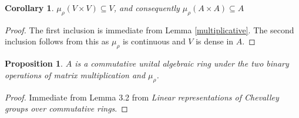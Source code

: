 \documentclass[12pt]{article}
\newtheorem{proposition}{Proposition}
\newtheorem{corollary}{Corollary}
\theoremstyle{definition}
\begin{document}
\begin{corollary}
$\mu_\rho(V \times V) \subseteq V$, and consequently $\mu_\rho(A \times A) \subseteq A$
\end{corollary}
\begin{proof}
The first inclusion is immediate from Lemma \ref{multiplicative}. The second inclusion follows from this as $\mu_\rho$ is continuous and $V$ is dense in $A$.
\end{proof}

\begin{proposition}
$A$ is a commutative unital algebraic ring under the two binary operations of matrix multiplication and $\mu_\rho$.
\end{proposition}
\begin{proof}
Immediate from Lemma 3.2 from \textit{Linear representations of Chevalley groups over commutative rings}.
\end{proof}
\end{document}
